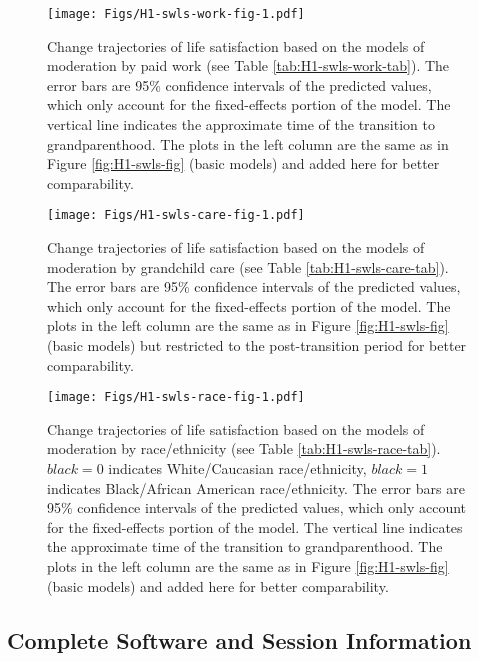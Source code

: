 \documentclass[
  english,
  man,floatsintext]{apa7}
\begin{document}
\begin{figure}
\centering
\texttt{[image: Figs/H1-swls-work-fig-1.pdf]}
\caption{\label{fig:H1-swls-work-fig}Change trajectories of life satisfaction based on the models of moderation by paid work (see Table \ref{tab:H1-swls-work-tab}). The error bars are 95\% confidence intervals of the predicted values, which only account for the fixed-effects portion of the model. The vertical line indicates the approximate time of the transition to grandparenthood. The plots in the left column are the same as in Figure \ref{fig:H1-swls-fig} (basic models) and added here for better comparability.}
\end{figure}



\begin{figure}
\centering
\texttt{[image: Figs/H1-swls-care-fig-1.pdf]}
\caption{\label{fig:H1-swls-care-fig}Change trajectories of life satisfaction based on the models of moderation by grandchild care (see Table \ref{tab:H1-swls-care-tab}). The error bars are 95\% confidence intervals of the predicted values, which only account for the fixed-effects portion of the model. The plots in the left column are the same as in Figure \ref{fig:H1-swls-fig} (basic models) but restricted to the post-transition period for better comparability.}
\end{figure}



\begin{figure}
\centering
\texttt{[image: Figs/H1-swls-race-fig-1.pdf]}
\caption{\label{fig:H1-swls-race-fig}Change trajectories of life satisfaction based on the models of moderation by race/ethnicity (see Table \ref{tab:H1-swls-race-tab}). \(black=0\) indicates White/Caucasian race/ethnicity, \(black=1\) indicates Black/African American race/ethnicity. The error bars are 95\% confidence intervals of the predicted values, which only account for the fixed-effects portion of the model. The vertical line indicates the approximate time of the transition to grandparenthood. The plots in the left column are the same as in Figure \ref{fig:H1-swls-fig} (basic models) and added here for better comparability.}
\end{figure}

\newpage

\hypertarget{complete-software-and-session-information}{%
\subsection{Complete Software and Session Information}\label{complete-software-and-session-information}}
\end{document}
